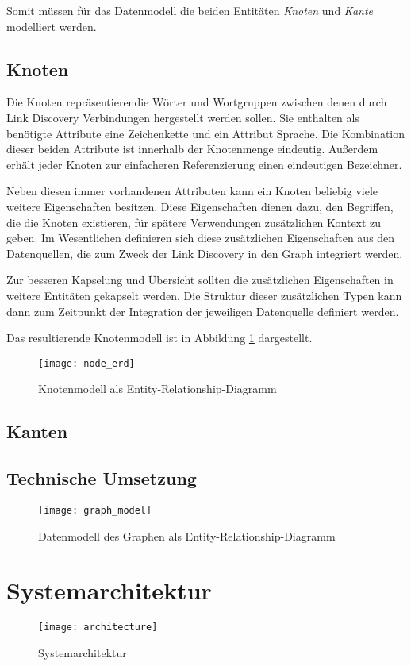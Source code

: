 Somit müssen für das Datenmodell die beiden Entitäten \emph{Knoten} und \emph{Kante} modelliert werden.

\subsection{Knoten}

Die Knoten repräsentierendie Wörter und Wortgruppen zwischen denen durch Link Discovery Verbindungen hergestellt werden sollen. Sie enthalten als benötigte Attribute eine Zeichenkette und ein Attribut Sprache. Die Kombination dieser beiden Attribute ist innerhalb der Knotenmenge eindeutig. Außerdem erhält jeder Knoten zur einfacheren Referenzierung einen eindeutigen Bezeichner.

Neben diesen immer vorhandenen Attributen kann ein Knoten beliebig viele weitere Eigenschaften besitzen. Diese Eigenschaften dienen dazu, den Begriffen, die die Knoten existieren, für spätere Verwendungen zusätzlichen Kontext zu geben. Im Wesentlichen definieren sich diese zusätzlichen Eigenschaften aus den Datenquellen, die zum Zweck der Link Discovery in den Graph integriert werden.

Zur besseren Kapselung und Übersicht sollten die zusätzlichen Eigenschaften in weitere Entitäten gekapselt werden. Die Struktur dieser zusätzlichen Typen kann dann zum Zeitpunkt der Integration der jeweiligen Datenquelle definiert werden.

Das resultierende Knotenmodell ist in Abbildung \ref{fig:node_erd} dargestellt.

\begin{figure}
\label{fig:node_erd}
\begin{center}
    \texttt{[image: node\_erd]}
\end{center}
\caption{Knotenmodell als Entity-Relationship-Diagramm}
\end{figure}

\subsection{Kanten}



\subsection{Technische Umsetzung}

\begin{figure}
\label{fig:graph_model}
\begin{center}
    \texttt{[image: graph\_model]}
\end{center}
\caption{Datenmodell des Graphen als Entity-Relationship-Diagramm}
\end{figure}

\section{Systemarchitektur}

\begin{figure}
\label{fig:architecture}
\begin{center}
    \texttt{[image: architecture]}
\end{center}
\caption{Systemarchitektur}
\end{figure}
